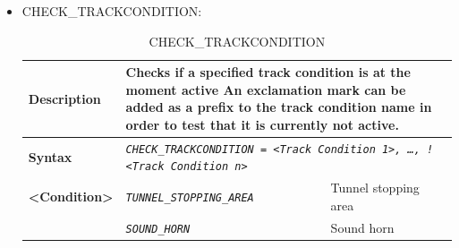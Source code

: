 \begin{itemize}
\begin{longtable}{|l|l|}
			\hline\hline

		\end{longtable}

	\item CHECK\_TRACKCONDITION:

		\begin{longtable}{|l|l|l|}
			\caption{CHECK\_TRACKCONDITION}\\
			\hline
				\begin{minipage}[t]{0.22\linewidth} \textbf{Description} \end{minipage}
			&	\multicolumn{2}{l|}{ \begin{minipage}[t]{0.78\linewidth} Checks if a specified track condition is at the moment active An exclamation mark can be added
			as a prefix to the track condition name in order to test that it is currently not active. \end{minipage} } \\

			\hline

				\begin{minipage}[t]{0.22\linewidth} \textbf{Syntax}	\end{minipage}
			&	\multicolumn{2}{l|}{ \begin{minipage}[t]{0.78\linewidth} \emph{\texttt{CHECK\_TRACKCONDITION = <Track Condition 1>, …, !<Track Condition n>}} \end{minipage} } \\

			\hline

				\multirow{1}{*}{ \begin{minipage}[t]{0.22\linewidth} \textbf{<Condition>} \end{minipage} }
			&	\begin{minipage}[t]{0.40\linewidth} \emph{\texttt{TUNNEL\_STOPPING\_AREA}} \end{minipage}
			&	\begin{minipage}[t]{0.33\linewidth} Tunnel stopping area \end{minipage} \\

			\hline

			&	\begin{minipage}[t]{0.40\linewidth} \emph{\texttt{SOUND\_HORN}} \end{minipage}
			&	\begin{minipage}[t]{0.33\linewidth} Sound horn \end{minipage} \\


\end{longtable}
\end{itemize}
